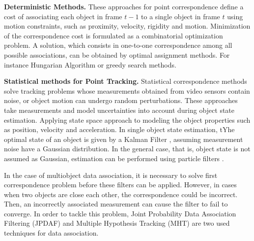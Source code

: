 \textbf{Deterministic Methods. } These approaches for point correspondence
define a cost of associating each object in frame $t-1$ to a single object in
frame $t$ using motion constraints, such as proximity, velocity, rigidity and
motion. Minimization of the correspondence cost is formulated as a
combinatorial optimization problem. A solution, which consists in one-to-one
correspondence among all possible associations, can be obtained by optimal
assignment methods. For instance Hungarian Algorithm \cite{Qin2012} or
greedy search methods.

\textbf{Statistical methods for Point Tracking. } Statistical correspondence
methods solve tracking problems whose measurements obtained from video sensors
contain noise, or object motion can undergo random perturbations. These
approaches take measurements and model uncertainties into account during
object state estimation. Applying state space approach to modeling the object
properties such as position, velocity and acceleration. In single object
state estimation, tYhe optimal state of an object is given by a Kalman Filter
\cite{Ren2008a,Heikkila2004}, assuming measurement noise have a Gaussian
distribution. In the general case, that is, object state is not assumed as
Gaussian, estimation can be performed using particle filters
\cite{Okuma2004,Rittscher2000}.

In the case of multiobject data association, it is necessary to solve first
correspondence problem before these filters can be applied. However, in cases
when two objects are close each other, the correspondence could be incorrect.
Then, an incorrectly associated measurement can cause the filter to fail to
converge. In order to tackle this problem, Joint Probability Data Association
Filtering (JPDAF) \cite{Schulz2003} and Multiple Hypothesis Tracking
(MHT) \cite{Zulkifley2012} are two used techniques for data association.

